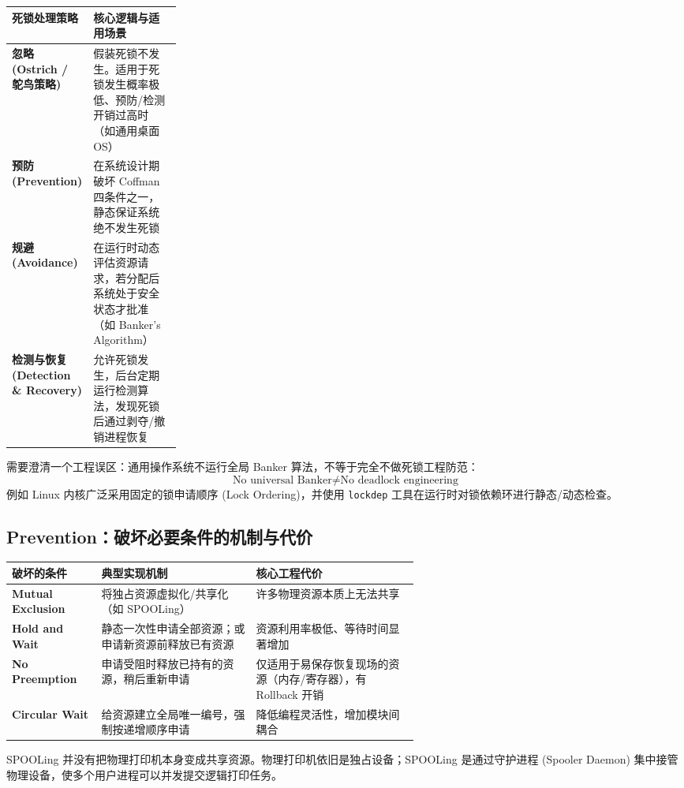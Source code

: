 \documentclass[11pt,a4paper]{ctexart}
\newcommand{\code}[1]{\texttt{#1}}
\begin{document}
\begingroup
\small
\renewcommand{\arraystretch}{1.25}
\setlength{\tabcolsep}{6pt}
\begin{tabularx}{\linewidth}{>{\bfseries}p{0.25\linewidth} X}
\toprule
死锁处理策略 & 核心逻辑与适用场景\\
\midrule
忽略 (Ostrich / 鸵鸟策略) & 假装死锁不发生。适用于死锁发生概率极低、预防/检测开销过高时（如通用桌面 OS）\\
预防 (Prevention) & 在系统设计期破坏 Coffman 四条件之一，静态保证系统绝不发生死锁\\
规避 (Avoidance) & 在运行时动态评估资源请求，若分配后系统处于安全状态才批准（如 Banker's Algorithm）\\
检测与恢复 (Detection \& Recovery) & 允许死锁发生，后台定期运行检测算法，发现死锁后通过剥夺/撤销进程恢复\\
\bottomrule
\end{tabularx}
\endgroup

需要澄清一个工程误区：通用操作系统不运行全局 Banker 算法，不等于完全不做死锁工程防范：
\[
\boxed{\text{No universal Banker} \neq \text{No deadlock engineering}}
\]
例如 Linux 内核广泛采用固定的锁申请顺序 (Lock Ordering)，并使用 \code{lockdep} 工具在运行时对锁依赖环进行静态/动态检查。

\subsection{Prevention：破坏必要条件的机制与代价}

\begingroup
\small
\renewcommand{\arraystretch}{1.25}
\setlength{\tabcolsep}{6pt}
\begin{tabularx}{\linewidth}{>{\bfseries}p{0.22\linewidth} p{0.38\linewidth} X}
\toprule
破坏的条件 & 典型实现机制 & 核心工程代价\\
\midrule
Mutual Exclusion & 将独占资源虚拟化/共享化（如 SPOOLing） & 许多物理资源本质上无法共享\\
Hold and Wait & 静态一次性申请全部资源；或申请新资源前释放已有资源 & 资源利用率极低、等待时间显著增加\\
No Preemption & 申请受阻时释放已持有的资源，稍后重新申请 & 仅适用于易保存恢复现场的资源（内存/寄存器），有 Rollback 开销\\
Circular Wait & 给资源建立全局唯一编号，强制按递增顺序申请 & 降低编程灵活性，增加模块间耦合\\
\bottomrule
\end{tabularx}
\endgroup

\begin{method}
SPOOLing 并没有把物理打印机本身变成共享资源。物理打印机依旧是独占设备；SPOOLing 是通过守护进程 (Spooler Daemon) 集中接管物理设备，使多个用户进程可以并发提交逻辑打印任务。
\end{method}
\end{document}
